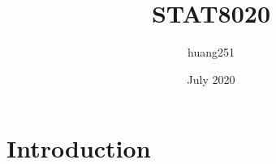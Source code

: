 \documentclass{article}
\title{STAT8020}
\author{huang251 }
\date{July 2020}
\begin{document}
\maketitle

\section{Introduction}
\end{document}

